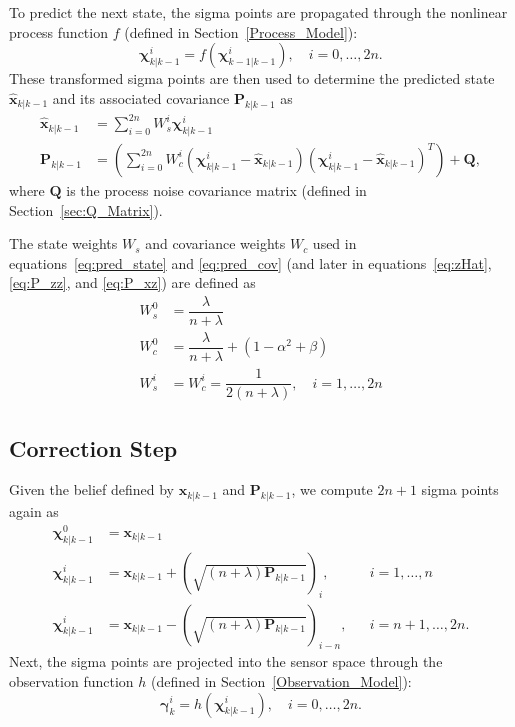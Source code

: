 To predict the next state, the sigma points are propagated through the nonlinear process function $f$ (defined in Section~\ref{Process_Model}):
%
\begin{equation}
\bm{\chi}^{i}_{k | k-1} = f \left( \bm{\chi}^{i}_{k-1 | k-1} \right), \quad i = 0, \dots, 2n.
\end{equation}
%
These transformed sigma points are then used to determine the predicted state $\hat{\mathbf{x}}_{k | k-1}$ and its associated covariance $\mathbf{P}_{k | k-1}$ as
%
\begin{align}
\hat{\mathbf{x}}_{k | k-1} &= \sum^{2n}_{i=0} W^{i}_{s} \bm{\chi}^{i}_{k | k-1} \label{eq:pred_state} \\
\mathbf{P}_{k | k-1} &= \left( \sum^{2n}_{i=0} W^{i}_{c} \left( \bm{\chi}^{i}_{k | k-1} - \hat{\mathbf{x}}_{k | k-1} \right) \left( \bm{\chi}^{i}_{k | k-1} - \hat{\mathbf{x}}_{k | k-1} \right)^{T} \right) + \mathbf{Q} , \label{eq:pred_cov}
\end{align}
%
where $\mathbf{Q}$ is the process noise covariance matrix (defined in Section~\ref{sec:Q_Matrix}).

The state weights $W_{s}$ and covariance weights $W_{c}$ used in equations~\ref{eq:pred_state} and \ref{eq:pred_cov} (and later in equations~\ref{eq:zHat}, \ref{eq:P_zz}, and \ref{eq:P_xz}) are defined as
%
\begin{align}
W^{0}_{s} &= \dfrac{\lambda}{n + \lambda} \nonumber \\
W^{0}_{c} &= \dfrac{\lambda}{n + \lambda} + \left( 1 - \alpha^{2} + \beta \right) \\
W^{i}_{s} &= W^{i}_{c} = \dfrac{1}{2 \left(n + \lambda \right)}, \quad i = 1, \dots, 2n \nonumber
\end{align}

\subsection{Correction Step}

Given the belief defined by $\mathbf{x}_{k | k-1}$ and $\mathbf{P}_{k | k-1}$, we compute $2n + 1$ sigma points again as
%
\begin{align}
\bm{\chi}^{0}_{k | k-1} &= \mathbf{x}_{k | k-1} & \nonumber\\
\bm{\chi}^{i}_{k | k-1} &= \mathbf{x}_{k | k-1} + \left( \sqrt{\left( n + \lambda \right) \mathbf{P}_{k | k-1}} \right)_{i}, &&i = 1, \dots, n \\
\bm{\chi}^{i}_{k | k-1} &= \mathbf{x}_{k | k-1} - \left( \sqrt{\left( n + \lambda \right) \mathbf{P}_{k | k-1}} \right)_{i-n}, &&i = n+1, \dots, 2n. \nonumber
\end{align}
%
Next, the sigma points are projected into the sensor space through the observation function $h$ (defined in Section~\ref{Observation_Model}):
%
\begin{equation}
\bm{\gamma}^{i}_{k} = h \left( \bm{\chi}^{i}_{k | k-1} \right), \quad i = 0, \dots, 2n.
\end{equation}

